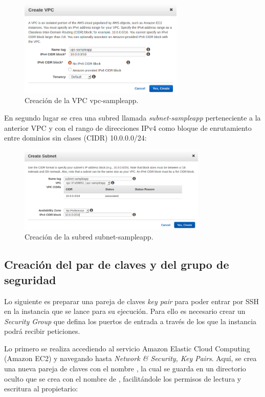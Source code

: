 \begin{figure}[H]
\centering
\includegraphics[width=0.7\textwidth]{images/figures/vpc-sampleapp.png}
\caption{Creación de la VPC vpc-sampleapp.}
\end{figure}

En segundo lugar se crea una subred llamada \textit{subnet-sampleapp} perteneciente a la anterior VPC y con el rango de direcciones IPv4 como bloque de enrutamiento entre dominios sin clases (CIDR) 10.0.0.0/24:

\begin{figure}[H]
\centering
\includegraphics[width=0.8\textwidth]{images/figures/subnet-sampleapp.png}
\caption{Creación de la subred subnet-sampleapp.}
\end{figure}

\subsection{Creación del par de claves y del grupo de seguridad}

Lo siguiente es preparar una pareja de claves \textit{key pair} para poder entrar por SSH en la instancia que se lance para su ejecución. Para ello es necesario crear un \textit{Security Group} que defina los puertos de entrada a través de los que la instancia podrá recibir peticiones.

Lo primero se realiza accediendo al servicio Amazon Elastic Cloud Computing (Amazon EC2) y navegando hasta \textit{Network \& Security, Key Pairs}. Aquí, se crea una nueva pareja de claves con el nombre , la cual se guarda en un directorio oculto que se crea con el nombre de , facilitándole los permisos de lectura y escritura al propietario:

